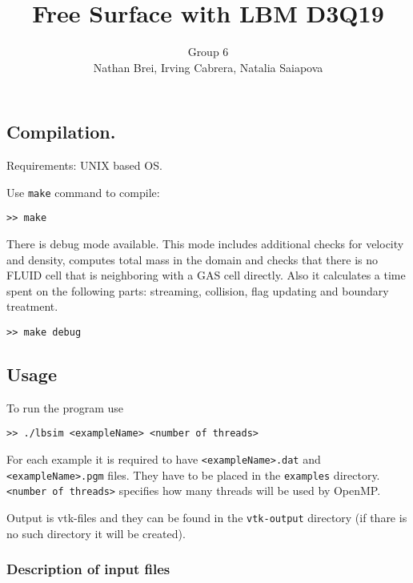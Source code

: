 \documentclass{article}
\begin{document}
\title{Free Surface with LBM D3Q19}
\author{Group 6\\Nathan Brei, Irving Cabrera, Natalia Saiapova}

\maketitle

\subsection{Compilation.}\label{compilation.}

Requirements: UNIX based OS.

Use \texttt{make} command to compile:

\begin{verbatim}
>> make
\end{verbatim}

There is debug mode available. This mode includes additional checks for
velocity and density, computes total mass in the domain and checks that
there is no FLUID cell that is neighboring with a GAS cell directly.
Also it calculates a time spent on the following parts: streaming,
collision, flag updating and boundary treatment.

\begin{verbatim}
>> make debug
\end{verbatim}

\subsection{Usage}\label{usage}

To run the program use

\begin{verbatim}
>> ./lbsim <exampleName> <number of threads>
\end{verbatim}

For each example it is required to have
\texttt{\textless{}exampleName\textgreater{}.dat} and
\texttt{\textless{}exampleName\textgreater{}.pgm} files. They have to be
placed in the \texttt{examples} directory.\\
\texttt{\textless{}number\ of\ threads\textgreater{}} specifies how many
threads will be used by OpenMP.

Output is vtk-files and they can be found in the \texttt{vtk-output}
directory (if thare is no such directory it will be created).

\subsubsection{Description of input
files}\label{description-of-input-files}
\end{document}
